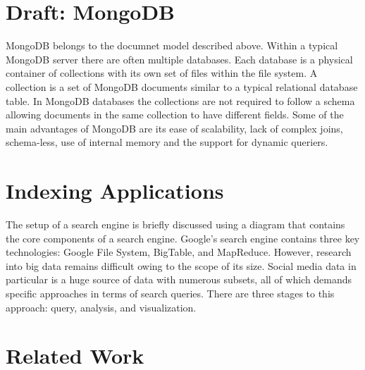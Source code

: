 

\section{Draft: MongoDB}
MongoDB belongs to the documnet model described above. Within a
typical MongoDB server there are often multiple databases. Each
database is a physical container of collections with its own set of
files within the file system. A collection is a set of MongoDB
documents similar to a typical relational database table. In MongoDB
databases the collections are not required to follow a schema allowing
documents in the same collection to have different fields. Some of
the main advantages of MongoDB are its ease of scalability, lack of
complex joins, schema-less, use of internal memory and the support for
dynamic queriers. 




\section{Indexing Applications}

The setup of a search engine is briefly discussed using a diagram that
contains the core components of a search engine. Google's search engine
contains three key technologies: Google File System, BigTable, and
MapReduce. However, research into big data remains difficult owing to
the scope of its size. Social media data in particular is a huge source
of data with numerous subsets, all of which demands specific approaches
in terms of search queries. There are three stages to this approach:
query, analysis, and visualization.




\section{Related Work}

